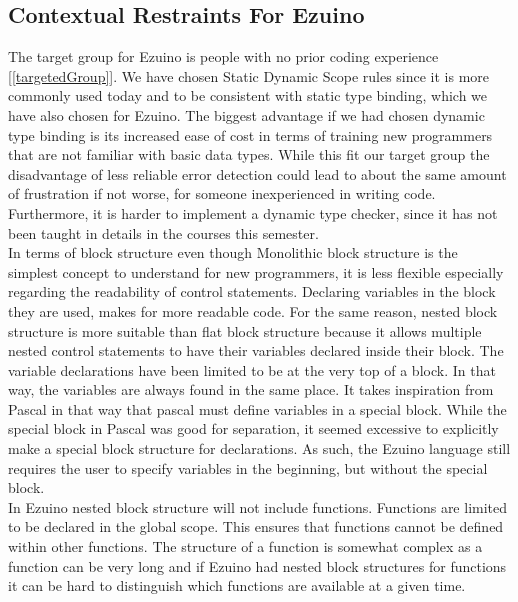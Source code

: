 \subsection{Contextual Restraints For Ezuino}
The target group for Ezuino is people with no prior coding experience [\ref{targetedGroup}]. We have chosen Static Dynamic Scope rules since it is more commonly used today and to be consistent with static type binding, which we have also chosen for Ezuino. The biggest advantage if we had chosen dynamic type binding is its increased ease of cost in terms of training new programmers that are not familiar with basic data types. While this fit our target group the disadvantage of less reliable error detection could lead to about the same amount of frustration if not worse, for someone inexperienced in writing code. Furthermore, it is harder to implement a dynamic type checker, since it has not been taught in details in the courses this semester. \\
In terms of block structure even though Monolithic block structure is the simplest concept to understand for new programmers, it is less flexible especially regarding the readability of control statements. Declaring variables in the block they are used, makes for more readable code. For the same reason, nested block structure is more suitable than flat block structure because it allows multiple nested control statements to have their variables declared inside their block.
The variable declarations have been limited to be at the very top of a block. In that way, the variables are always found in the same place. It takes inspiration from Pascal in that way that pascal must define variables in a special block. While the special block in Pascal was good for separation, it seemed excessive to explicitly make a special block structure for declarations. As such, the Ezuino language still requires the user to specify variables in the beginning, but without the special block. \\
In Ezuino nested block structure will not include functions. Functions are limited to be declared in the global scope. This ensures that functions cannot be defined within other functions. The structure of a function is somewhat complex as a function can be very long and if Ezuino had nested block structures for functions it can be hard to distinguish which functions are available at a given time.

